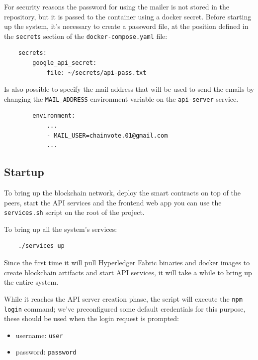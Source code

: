 \documentclass{scrartcl}
\begin{document}
\begin{warn}
    For security reasons the password for using the mailer is not stored in the repository, but it is passed to the container using a docker secret. Before starting up the system, it's necessary to create a password file, at the position defined in the \texttt{secrets} section of the \texttt{docker-compose.yaml} file:
    \begin{verbatim}
    secrets:
        google_api_secret:
            file: ~/secrets/api-pass.txt
    \end{verbatim}

    Is also possible to specify the mail address that will be used to send the emails by changing the \texttt{MAIL\_ADDRESS} environment variable on the \texttt{api-server} service.

    \begin{verbatim}
        environment:
            ...
            - MAIL_USER=chainvote.01@gmail.com
            ...
        \end{verbatim}
\end{warn}

    



\subsection{Startup}

To bring up the blockchain network, deploy the smart contracts on top of the peers, start the API services and the frontend web app you can use the \texttt{services.sh} script on the root of the project.

To bring up all the system's services:

\begin{verbatim}
    ./services up
\end{verbatim}

Since the first time it will pull Hyperledger Fabric binaries and docker images to create blockchain artifacts and start API services, it will take a while to bring up the entire system.

While it reaches the API server creation phase, the script will execute the \texttt{npm login} command; we've preconfigured some default credentials for this purpose, these should be used when the login request is prompted:
\begin{itemize}
    \item username: \texttt{user}
    \item password: \texttt{password}
\end{itemize} 
\end{document}
